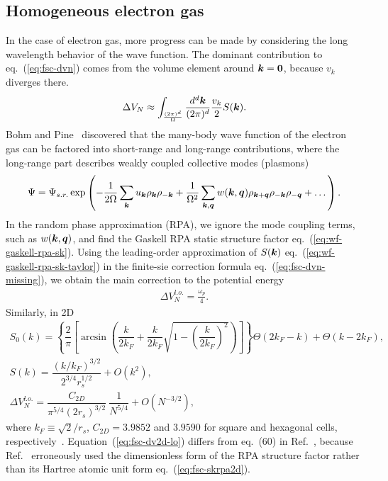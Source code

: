 \subsection{Homogeneous electron gas}
In the case of electron gas, more progress can be made by considering the long wavelength behavior of the wave function. The dominant contribution to eq.~(\ref{eq:fsc-dvn}) comes from the volume element around $\boldsymbol{k}=\boldsymbol{0}$, because $v_k$ diverges there.
\begin{align} \label{eq:fsc-dvn-missing}
\Delta V_N \approx \int_{\frac{(2\pi)^d}{\Omega}} \dfrac{d^d\boldsymbol{k}}{(2\pi)^d} \frac{v_k}{2}S(\boldsymbol{k}).
\end{align}
Bohm and Pine~\cite{Bohm1953} discovered that the many-body wave function of the electron gas can be factored into short-range and long-range contributions, where the long-range part describes weakly coupled collective modes (plasmons)~\cite{Chiesa2007,Holzmann2016}
\begin{align} \label{eq:fsc-rpa-wf}
\Psi = \Psi_{s.r.} \exp\left(
-\frac{1}{2\Omega} \sum\limits_{\boldsymbol{k}} u_{\boldsymbol{k}} \rho_{\boldsymbol{k}} \rho_{-\boldsymbol{k}} + \frac{1}{\Omega^2}\sum\limits_{\boldsymbol{k},\boldsymbol{q}} w(\boldsymbol{k}, \boldsymbol{q}) \rho_{\boldsymbol{k}+\boldsymbol{q}}\rho_{-\boldsymbol{k}}\rho_{-\boldsymbol{q}}+\dots
\right).
\end{align}
In the random phase approximation (RPA), we ignore the mode coupling terms, such as $w(\boldsymbol{k},\boldsymbol{q})$, and find the Gaskell RPA static structure factor eq.~(\ref{eq:wf-gaskell-rpa-sk}).
Using the leading-order approximation of $S(\boldsymbol{k})$ eq.~(\ref{eq:wf-gaskell-rpa-sk-taylor}) in the finite-sie correction formula eq.~(\ref{eq:fsc-dvn-missing}), we obtain the main correction to the potential energy
\begin{align}
\Delta V_N^{l.o.} = \frac{\omega_p}{4}.
\end{align}
Similarly, in 2D~\cite{Gori-Giorgi2004}
\begin{align}
S_0(k) = \left\{
\dfrac{2}{\pi}\left[
\arcsin\left(\dfrac{k}{2k_F}+\dfrac{k}{2k_F}\sqrt{1-\left(\dfrac{k}{2k_F}\right)^2}\right)
\right]\right\} \Theta(2k_F-k) + \Theta(k-2k_F), \\
S(k) = \dfrac{(k/k_F)^{3/2}}{2^{3/4}r_s^{1/2}} + O(k^2), \label{eq:fsc-skrpa2d}\\
\Delta V_N^{l.o.} = \dfrac{C_{2D}}{\pi^{5/4} (2r_s)^{3/2}}~\dfrac{1}{N^{5/4}} + O(N^{-3/2}), \label{eq:fsc-dv2d-lo}
\end{align}
where $k_F\equiv\sqrt{2}/r_s$, $C_{2D}=3.9852$ and $3.9590$ for square and hexagonal cells, respectively~\cite{Drummond2008}. Equation~(\ref{eq:fsc-dv2d-lo}) differs from eq.~(60) in Ref.~\cite{Drummond2008}, because Ref.~\cite{Drummond2008} erroneously used the dimensionless form of the RPA structure factor rather than its Hartree atomic unit form eq.~(\ref{eq:fsc-skrpa2d}).

